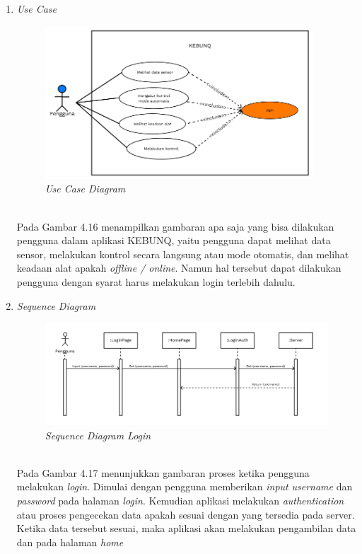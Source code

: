 \begin{flushleft}
\begin{justify}
\begin{enumerate}[label=\alph*.]
            \item \textit{Use Case}
            \begin{figure}[ht]
                \centering
                \includegraphics[width=10cm]{images/bab 4/use-case-user.png}
                \caption{\textit{Use Case Diagram}}
            \end{figure}
            \\Pada Gambar 4.16 menampilkan gambaran apa saja yang bisa dilakukan pengguna dalam aplikasi KEBUNQ, yaitu pengguna dapat melihat data sensor,
            melakukan kontrol secara langsung atau mode otomatis, dan melihat keadaan alat apakah \emph{offline / online}. Namun hal tersebut dapat dilakukan pengguna dengan syarat harus melakukan
            login terlebih dahulu.
            \item \textit{Sequence Diagram}
            \begin{figure}[ht]
                \centering
                \includegraphics[width=12cm]{images/bab 4/Sequence login.png}
                \caption{\textit{Sequence Diagram Login}}
            \end{figure}
            \\Pada Gambar 4.17 menunjukkan gambaran proses ketika pengguna melakukan \emph{login}. Dimulai dengan pengguna memberikan \emph{input} \emph{username} dan \emph{password} pada halaman \emph{login}. Kemudian aplikasi melakukan \emph{authentication} atau proses pengecekan data apakah sesuai dengan yang tersedia pada server. Ketika data tersebut sesuai, maka aplikasi akan melakukan pengambilan data dan pada halaman \emph{home}

\end{enumerate}
\end{justify}
\end{flushleft}
